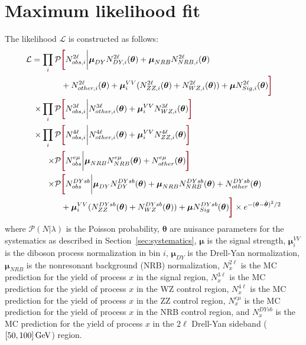 \section{Maximum likelihood fit}
\label{sec:likelihood}
The likelihood $\mathcal{L}$ is constructed as follows:
\begin{equation}
\begin{split}
  \mathcal{L} = \prod_{i} \mathcal{P}&\termLB N^{2\ell}_{obs,i} \bigg| \boldsymbol\mu_{DY} N^{2\ell}_{DY,i}(\boldsymbol\theta) + \boldsymbol\mu_{NRB} N^{2\ell}_{NRB,i}(\boldsymbol\theta) \\
  & + N^{2\ell}_{other,i}(\boldsymbol\theta) + \boldsymbol\mu_i^{VV} (N^{2\ell}_{ZZ,i}(\boldsymbol\theta)+N^{2\ell}_{WZ,i}(\boldsymbol\theta)) + \boldsymbol\mu N^{2\ell}_{Sig,i}(\boldsymbol\theta) \termRB \\
   \times \prod_{i} \mathcal{P} & \termLB N^{3\ell}_{obs,i} \bigg| N^{3\ell}_{other,i}(\boldsymbol\theta) + \boldsymbol\mu_i^{VV} N^{3\ell}_{WZ,i}(\boldsymbol\theta) \termRB \\
   \times \prod_{i} \mathcal{P} & \termLB N^{4\ell}_{obs,i} \bigg| N^{4\ell}_{other,i}(\boldsymbol\theta) + \boldsymbol\mu_i^{VV} N^{4\ell}_{ZZ,i}(\boldsymbol\theta) \termRB \\
   \times \mathcal{P}&\termLB N^{e\mu}_{obs} \bigg| \boldsymbol\mu_{NRB} N^{e\mu}_{NRB}(\boldsymbol\theta) + N^{e\mu}_{other}(\boldsymbol\theta) \termRB \\
   \times \mathcal{P}&\termLB N^{DYsb}_{obs} \bigg| \boldsymbol\mu_{DY} N^{DYsb}_{DY}(\boldsymbol\theta) + \boldsymbol\mu_{NRB} N^{DYsb}_{NRB}(\boldsymbol\theta) + N^{DYsb}_{other}(\boldsymbol\theta) \\
   & + \boldsymbol\mu_i^{VV} (N^{DYsb}_{ZZ}(\boldsymbol\theta)+N^{DYsb}_{WZ}(\boldsymbol\theta)) + \boldsymbol\mu N^{DYsb}_{Sig}(\boldsymbol\theta) \termRB  \times e^{-({\boldsymbol\theta}-\hat{{\boldsymbol\theta}})^2/2}
\end{split}
\end{equation}
where $\mathcal{P}(N|\lambda)$ is the Poisson probability,
${\boldsymbol\theta}$ are nuisance parameters for the systematics as described in Section~\ref{sec:systematics},
$\boldsymbol\mu$ is the signal strength,
$\boldsymbol\mu_i^{VV}$ is the diboson process normalization in bin $i$,
$\boldsymbol\mu_{DY}$ is the Drell-Yan normalization,
$\boldsymbol\mu_{NRB}$ is the nonresonant background (NRB) normalization,
$N^{2\ell}_{x}$ is the MC prediction for the yield of process $x$ in the signal region,
$N^{3\ell}_{x}$ is the MC prediction for the yield of process $x$ in the WZ control region,
$N^{4\ell}_{x}$ is the MC prediction for the yield of process $x$ in the ZZ control region,
$N^{e\mu}_{x}$ is the MC prediction for the yield of process $x$ in the NRB control region,
and $N^{DYsb}_{x}$ is the MC prediction for the yield of process $x$ in the $2\ell$ Drell-Yan sideband ($[50,100]\,\text{Ge\hspace{-.08em}V}$) region.
